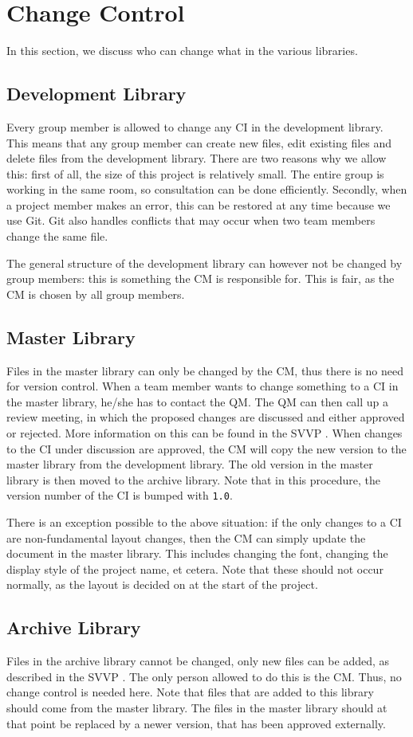 \section{Change Control}
In this section, we discuss who can change what in the various libraries.

\subsection{Development Library}
Every group member is allowed to change any CI in the development library. This means that any group member can create new files, edit existing files and delete files from the development library. There are two reasons why we allow this: first of all, the size of this project is relatively small. The entire group is working in the same room, so consultation can be done efficiently. Secondly, when a project member makes an error, this can be restored at any time because we use Git. Git also handles conflicts that may occur when two team members change the same file.

The general structure of the development library can however not be changed by group members: this is something the CM is responsible for. This is fair, as the CM is chosen by all group members.

\subsection{Master Library}
Files in the master library can only be changed by the CM, thus there is no need for version control. When a team member wants to change something to a CI in the master library, he/she has to contact the QM. The QM can then call up a review meeting, in which the proposed changes are discussed and either approved or rejected. More information on this can be found in the SVVP \cite{svvp}. When changes to the CI under discussion are approved, the CM will copy the new version to the master library from the development library. The old version in the master library is then moved to the archive library. Note that in this procedure, the version number of the CI is bumped with \texttt{1.0}.

There is an exception possible to the above situation: if the only changes to a CI are non-fundamental layout changes, then the CM can simply update the document in the master library. This includes changing the font, changing the display style of the project name, et cetera. Note that these should not occur normally, as the layout is decided on at the start of the project.

\subsection{Archive Library}
Files in the archive library cannot be changed, only new files can be added, as described in the SVVP \cite{svvp}. The only person allowed to do this is the CM. Thus, no change control is needed here. Note that files that are added to this library should come from the master library. The files in the master library should at that point be replaced by a newer version, that has been approved externally.
